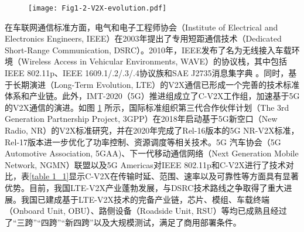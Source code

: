 \begin{figure}[h]
	\centering
\texttt{[image: Fig1-2-V2X-evolution.pdf]}
	\label{fig 1-2}
\end{figure}

在车联网通信标准方面，电气和电子工程师协会（Institute of Electrical and Electronics Engineers, IEEE）在2003年提出了专用短距通信技术（Dedicated Short-Range Communication, DSRC）。2010年，IEEE发布了名为无线接入车载环境（Wireless Access in Vehicular Environments, WAVE）的协议栈，其中包括IEEE 802.11p、IEEE 1609.1/.2/.3/.4协议族和SAE J2735消息集字典 \cite{wu2013vehicular}。同时，基于长期演进（Long-Term Evolution, LTE）的V2X通信已形成一个完善的技术标准体系和产业链\cite{chen2016lte}。此外，IMT-2020（5G）推进组成立了C-V2X工作组，加速基于5G的V2X通信的演进。如图 \ref{fig 1-2} 所示，国际标准组织第三代合作伙伴计划（The 3rd Generation Partnership Project, 3GPP）在2018年启动基于5G新空口（New Radio, NR）的V2X标准研究，并在2020年完成了Rel-16版本的5G NR-V2X标准\cite{saad2021advancements}，Rel-17版本进一步优化了功率控制、资源调度等相关技术。5G 汽车协会（5G Automotive Association, 5GAA)、下一代移动通信网络（Next Generation Mobile Network, NGMN）联盟以及5G Americas对IEEE 802.11p和C-V2X进行了技术对比，表\ref{table 1_1}显示C-V2X在传输时延、范围、速率以及可靠性等方面具有显著优势。目前，我国LTE-V2X产业蓬勃发展，与DSRC技术路线之争取得了重大进展。我国已建成基于LTE-V2X技术的完备产业链，芯片、模组、车载终端（Onboard Unit, OBU）、路侧设备（Roadside Unit, RSU）等均已成熟且经过了“三跨”“四跨”“新四跨”以及大规模测试，满足了商用部署条件。

